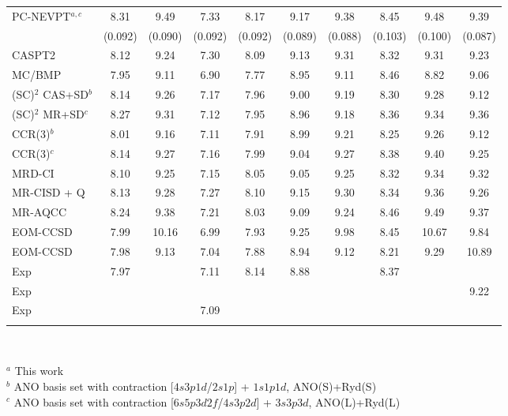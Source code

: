 \documentclass[global,referee]{svjour}
\begin{document}
\begin{table*}[h]
\begin{tabular}{lccccccccc}
PC-NEVPT$^{a,c}$&   8.31 & 9.49  & 7.33  & 8.17  & 9.17  & 9.38  & 8.45  & 9.48  & 9.39 \\
                & (0.092)&(0.090)&(0.092)&(0.092)&(0.089)&(0.088)&(0.103)&(0.100)&(0.087)\\
CASPT2 \cite{Merch95}
                &   8.12 & 9.24  & 7.30  & 8.09  & 9.13  & 9.31  & 8.32  & 9.31  & 9.23 \\
MC/BMP \cite{Paris96}
                &   7.95 & 9.11  & 6.90  & 7.77  & 8.95  & 9.11  & 8.46  & 8.82  & 9.06 \\
(SC)$^2$ CAS+SD$^b$ \cite{Ruiz03}
                &   8.14 & 9.26  & 7.17  & 7.96  & 9.00  & 9.19  & 8.30  & 9.28  & 9.12 \\
(SC)$^2$ MR+SD$^c$ \cite{Ruiz03}
                &   8.27 & 9.31  & 7.12  & 7.95  & 8.96  & 9.18  & 8.36  & 9.34  & 9.36 \\
CCR(3)$^b$ \cite{Ruiz03}
               &    8.01 & 9.16  & 7.11  & 7.91  & 8.99  & 9.21  & 8.25  & 9.26  & 9.12 \\
CCR(3)$^c$ \cite{Ruiz03}
               &    8.14 & 9.27  & 7.16  & 7.99  & 9.04  & 9.27  & 8.38  & 9.40  & 9.25 \\
MRD-CI \cite{Hachey95}
                &   8.10 & 9.25  & 7.15  & 8.05  & 9.05  & 9.25  & 8.32  & 9.34  & 9.32 \\
MR-CISD + Q \cite{Muller01}
                &   8.13 & 9.28  & 7.27  & 8.10  & 9.15  & 9.30  & 8.34  & 9.36  & 9.26 \\
MR-AQCC  \cite{Muller01}
                &   8.24 & 9.38  & 7.21  & 8.03  & 9.09  & 9.24  & 8.46  & 9.49  & 9.37 \\
EOM-CCSD \cite{gwalt95}
                &   7.99 &10.16  & 6.99  & 7.93  & 9.25  & 9.98  & 8.45  &10.67  & 9.84 \\
EOM-CCSD \cite{Wiberg02}
                &   7.98 & 9.13  & 7.04  & 7.88  & 8.94  & 9.12  & 8.21  & 9.29  &10.89 \\
Exp \cite{Robin85}
                &   7.97 &       & 7.11  & 8.14  & 8.88  &       & 8.37  &       &      \\
Exp \cite{Taylor82}
                &        &       &       &       &       &       &       &       & 9.22 \\
Exp \cite{Brint85,Suto86}
                &        &       & 7.09  &       &       &       &       &       &      \\
\noalign{\smallskip}\hline
\end{tabular}\\
{\smallskip}

$^a$  This work\\
$^b$  ANO basis set with contraction [$4s3p1d$/$2s1p$] + $1s1p1d$, ANO(S)+Ryd(S)\\
$^c$  ANO basis set with contraction [$6s5p3d2f$/$4s3p2d$] + $3s3p3d$, ANO(L)+Ryd(L)
\end{table*}
\end{document}
